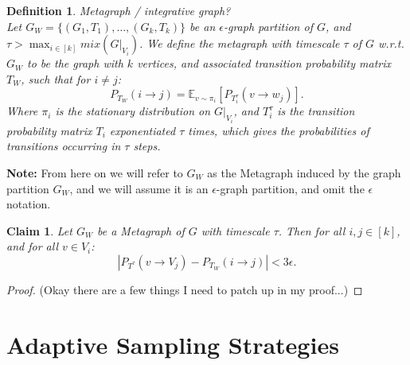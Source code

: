 \documentclass{article}
\newtheorem{definition}{Definition}
\newtheorem{claim}{Claim}
\begin{document}
\begin{definition}
    Metagraph / integrative graph? \\
    Let $G_{W} = \{(G_1, T_1), \dots, (G_k, T_k)\}$ be an $\epsilon$-graph partition of $G$, and $\tau > \max_{i\in [k]}mix(G|_{V_i})$. We define the metagraph with timescale $\tau$ of $G$ w.r.t. $G_{W}$ to be the graph with $k$ vertices, and associated transition probability matrix $T_W$, such that for $i\neq j$:
    \[
        P_{T_W}(i \rightarrow j) = \mathbb{E}_{v \sim \pi_i}[P_{T_i^\tau}(v\rightarrow w_j)]
    .\] 
    Where $\pi_i$ is the stationary distribution on $G|_{V_i}$, and $T_i^\tau$ is the transition probability matrix $T_i$ exponentiated $\tau$ times, which gives the probabilities of transitions occurring in $\tau$ steps.
\end{definition}
\textbf{Note:} From here on we will refer to $G_W$ as the Metagraph induced by the graph partition $G_W$, and we will assume it is an $\epsilon$-graph partition, and omit the $\epsilon$ notation.

\begin{claim}
    Let $G_W$ be a Metagraph of $G$ with timescale $\tau$. Then for all $i,j \in [k]$, and for all $v\in V_i$:
    \[
        |P_{T^\tau}(v\rightarrow V_j) - P_{T_W}(i\rightarrow j)| < 3\epsilon
    .\] 
\end{claim}
\begin{proof}
    (Okay there are a few things I need to patch up in my proof...)
    
\end{proof}
\section{Adaptive Sampling Strategies}
\end{document}
